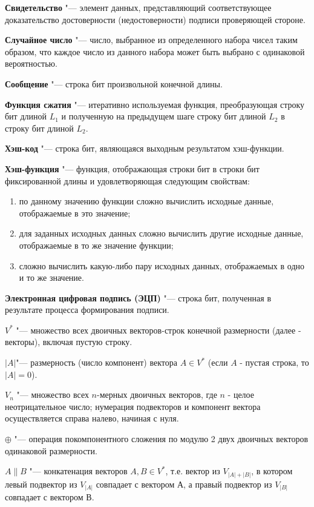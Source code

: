 \textbf{Свидетельство} "--- элемент данных, представляющий соответствующее доказательство достоверности (недостоверности) подписи проверяющей стороне.
\par
\textbf{Случайное число} "--- число, выбранное из определенного набора чисел таким образом, что каждое число из данного набора может быть выбрано с одинаковой вероятностью.
\par
\textbf{Сообщение} "--- строка бит произвольной конечной длины.
\par
\textbf{Функция сжатия} "--- итеративно используемая функция, преобразующая строку бит длиной $L_1$ и полученную на предыдущем шаге строку бит длиной $L_2$ в строку бит длиной $L_2$.
\par
\textbf{Хэш-код} "--- строка бит, являющаяся выходным результатом хэш-функции.
\par
\textbf{Хэш-функция} "--- функция, отображающая строки бит в строки бит фиксированной длины и удовлетворяющая следующим свойствам:
\begin{enumerate}
	\item по данному значению функции сложно вычислить исходные данные, отображаемые в это значение;
	\item для заданных исходных данных сложно вычислить другие исходные данные, отображаемые в то же значение функции;
	\item сложно вычислить какую-либо пару исходных данных, отображаемых в одно и то же значение.
\end{enumerate}
\par
\textbf{Электронная цифровая подпись (ЭЦП)} "--- строка бит, полученная в результате процесса формирования подписи.
\par
$V^*$ "--- множество всех двоичных векторов-строк конечной размерности (далее - векторы), включая пустую строку.
\par
$|A|$"--- размерность (число компонент) вектора $A\in V^*$ (если $A$ - пустая строка, то $|A|=0$).
\par
$V_n$ "--- множество всех $n$-мерных двоичных векторов, где $n$ - целое неотрицательное число; нумерация подвекторов и компонент вектора осуществляется справа налево, начиная с нуля.
\par
$\oplus$ "--- операция покомпонентного сложения по модулю 2 двух двоичных векторов одинаковой размерности.
\par
$A\|B$ "--- конкатенация векторов $A,B\in V^*$, т.е. вектор из $V_{|A|+|B|}$, в котором левый подвектор из $V_{|A|}$ совпадает с вектором $А$, а правый подвектор из $V_{|B|}$ совпадает с вектором $В$.
